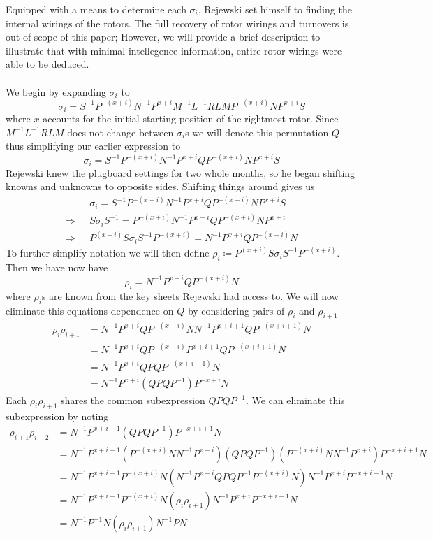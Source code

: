 Equipped with a means to determine each $\sigma_i$, Rejewski set
himself to finding the internal wirings of the rotors. The full
recovery of rotor wirings and turnovers is out of scope of this paper;
However, we will provide a brief description to illustrate that with
minimal intellegence information, entire rotor wirings were able to be deduced.
\\\\We begin by expanding $\sigma_i$ to
\[
	\sigma_i = S^{-1}P^{-(x+i)}N^{-1}P^{x+i}M^{-1}L^{-1}RLMP^{-(x+i)}NP^{x+i}S
\]
where $x$ accounts for the initial starting position of the rightmost rotor.
Since $M^{-1}L^{-1}RLM$ does not change between $\sigma_i$s we will
denote this permutation $Q$ thus simplifying our earlier expression to
\[
	\sigma_i = S^{-1}P^{-(x+i)}N^{-1}P^{x+i}QP^{-(x+i)}NP^{x+i}S
\]
Rejewski knew the plugboard settings for two whole months, so he
began shifting knowns and unknowns to opposite sides. Shifting things
around gives us
\begin{align*}
	                    & \sigma_i = S^{-1}P^{-(x+i)}N^{-1}P^{x+i}QP^{-(x+i)}NP^{x+i}S \\
	\Rightarrow\text{ } & S\sigma_i S^{-1} =
	P^{-(x+i)}N^{-1}P^{x+i}QP^{-(x+i)}NP^{x+i}
	\\
	\Rightarrow\text{ } & P^{(x+i)}S\sigma_i S^{-1}P^{-(x+i)} =
	N^{-1}P^{x+i}QP^{-(x+i)}N
\end{align*}
To further simplify notation we will then define ${\rho_i} \coloneq
	P^{(x+i)}S\sigma_i S^{-1}P^{-(x+i)}$. Then we have now have
\[
	\rho_i = N^{-1}P^{x+i}QP^{-(x+i)}N
\]
where $\rho_i$s are known from the key sheets Rejewski had access to.
We will now eliminate this equations dependence on $Q$ by considering
pairs of $\rho_i$ and $\rho_{i+1}$
\begin{align*}
	\rho_i\rho_{i+1} & = N^{-1}P^{x+i}QP^{-(x+i)}NN^{-1}P^{x+i+1}QP^{-(x+i+1)}N \\
	                 & = N^{-1}P^{x+i}QP^{-(x+i)}P^{x+i+1}QP^{-(x+i+1)}N        \\
	                 & = N^{-1}P^{x+i}QPQP^{-(x+i+1)}N                          \\
	                 & =N^{-1}P^{x+i}(QPQP^{-1})P^{-{x+i}}N
\end{align*}
Each $\rho_i\rho_{i+1}$ shares the common subexpression $QPQP^{-1}$.
We can eliminate this subexpression by noting
\begin{align*}
	\rho_{i+1}\rho_{i+2} & = N^{-1}P^{x+i+1}(QPQP^{-1})P^{-{x+i+1}}N
	\\
	                     & =
	N^{-1}P^{x+i+1}(P^{-(x+i)}NN^{-1}P^{x+i})(QPQP^{-1})(P^{-(x+i)}NN^{-1}P^{x+i})P^{-{x+i+1}}N
	\\
	                     & =
	N^{-1}P^{x+i+1}P^{-(x+i)}N(N^{-1}P^{x+i}QPQP^{-1}P^{-(x+i)}N)N^{-1}P^{x+i}P^{-{x+i+1}}N
	\\
	                     & =
	N^{-1}P^{x+i+1}P^{-(x+i)}N(\rho_i\rho_{i+1})N^{-1}P^{x+i}P^{-{x+i+1}}N
	\\
	                     & = N^{-1}P^{-1}N(\rho_i\rho_{i+1})N^{-1}PN
	\\
\end{align*}
